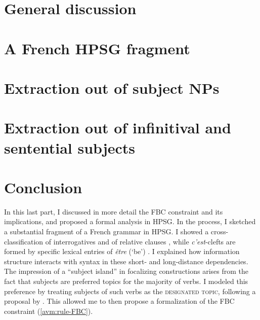 \chapter{General discussion}
\label{ch:fbc-generals}


\chapter{A French HPSG fragment}
\label{ch:hpsg-fragment}



\chapter{Extraction out of subject NPs}
\label{ch:hpsg-fbc}


\chapter{Extraction out of infinitival and sentential subjects}
\label{ch:hpsg-sent-subj}




\chapter{Conclusion}

In this last part, I discussed in more detail the FBC constraint and its implications, and proposed a formal analysis in HPSG. In the process, I sketched a substantial fragment of a French grammar in HPSG. I showed a cross-classification of interrogatives \citep[inspired by][]{Ginzburg.2000} and of relative clauses \citep[based on][]{Abeille.2007.Relatives}, while \emph{c'est}-clefts are formed by specific lexical entries of \emph{être} (`be') \citep{Winckel.2020}. I explained how information structure interacts with syntax in these short- and long-distance dependencies. The impression of a ``subject island'' in focalizing constructions arises from the fact that subjects are preferred topics for the majority of verbs. I modeled this preference by treating subjects of such verbs as the \textsc{designated topic}, following a proposal by \citet{Bildhauer.2010}. This allowed me to then propose a formalization of the FBC constraint (\ref{avm:rule-FBC}).

